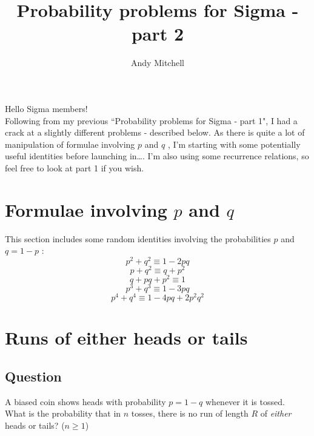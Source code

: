 \documentclass[a4paper,10pt]{article}
\author{Andy Mitchell}
\title{Probability problems for Sigma - part 2}
\begin{document}
 
\maketitle 
\begin{flushleft} 
Hello Sigma members! 
\\
Following from my previous ``Probability problems for Sigma - part 1", I had a crack at a slightly different problems - described below.
As there is quite a lot of manipulation of formulae involving $p$ and $q$ , I'm starting with some potentially useful identities before launching in\ldots.
I'm also using some recurrence relations, so feel free to look at part 1 if you wish.

\section{Formulae involving $p$ and $q$}
This section includes some random identities involving the probabilities $p$ and $q = 1-p$ :
\begin{equation}
p^2 + q^2 \equiv 1 - 2pq \tag{PQ1} \label{PQ1}
\end{equation}
\begin{equation}
p + q^2 \equiv q + p^2 \tag{PQ2} \label{PQ2}
\end{equation}
\begin{equation}
q + pq + p^2  \equiv 1 \tag{PQ3} \label{PQ3}
\end{equation}
\begin{equation}
p^3 + q^3  \equiv 1-3pq \tag{PQ4} \label{PQ4}
\end{equation}
\begin{equation}
p^4 + q^4  \equiv 1-4pq + 2p^2q^2 \tag{PQ5} \label{PQ5}
\end{equation}


\section{Runs of either heads or tails}
\subsection{Question}

A biased coin shows heads with probability $p = 1 - q$ whenever it is tossed. \\
What is the probability that in $n$ tosses, there is no run of length $R$ of \emph{either} heads or tails? ($n \geq 1$)


\end{flushleft}
\end{document}
